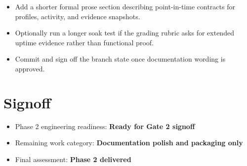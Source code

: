\documentclass{article}
\begin{document}
\begin{itemize}
\item Add a shorter formal prose section describing point-in-time contracts for profiles, activity, and evidence snapshots.
\item Optionally run a longer soak test if the grading rubric asks for extended uptime evidence rather than functional proof.
\item Commit and sign off the branch state once documentation wording is approved.
\end{itemize}

\section*{Signoff}

\begin{itemize}
\item Phase 2 engineering readiness: \textbf{Ready for Gate 2 signoff}
\item Remaining work category: \textbf{Documentation polish and packaging only}
\item Final assessment: \textbf{Phase 2 delivered}
\end{itemize}
\end{document}
